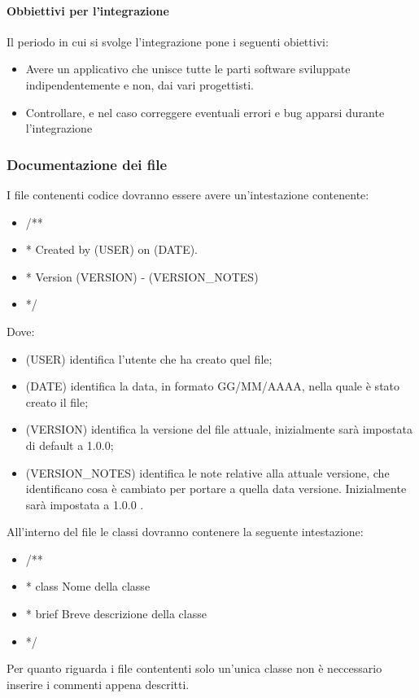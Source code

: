 \paragraph{Obbiettivi per l'integrazione}
Il periodo in cui si svolge l'integrazione pone i seguenti obiettivi:
\begin{itemize}
\item Avere un applicativo che unisce tutte le parti software sviluppate indipendentemente e non, dai vari progettisti.
\item Controllare, e nel caso correggere eventuali errori e bug apparsi durante l'integrazione
\end{itemize}

\subsubsection{Documentazione dei file}
I file contenenti codice dovranno essere avere un’intestazione contenente:
\begin{itemize}
\color{ForestGreen}
\item /** 
\item *   Created by (USER) on (DATE).
\item *   Version (VERSION) - (VERSION\_NOTES)
\item */
\end{itemize}
Dove:
\begin{itemize}
\color{ForestGreen}
\item (USER) identifica l'utente che ha creato quel file;
\item (DATE) identifica la data, in formato GG/MM/AAAA, nella quale è stato creato il file;
\item (VERSION) identifica la versione del file attuale, inizialmente sarà impostata di default a 1.0.0;
\item (VERSION\_NOTES) identifica le note relative alla attuale versione, che identificano cosa è cambiato per portare a quella data versione. Inizialmente sarà impostata a 1.0.0 .
\end{itemize}



All'interno del file le classi dovranno contenere la seguente intestazione:
\begin{itemize}
\color{ForestGreen}
\item /**
\item *  class Nome della classe
\item *  brief Breve descrizione della classe
\item */
\end{itemize}
Per quanto riguarda i file contententi solo un'unica classe non è neccessario inserire i commenti appena descritti.




